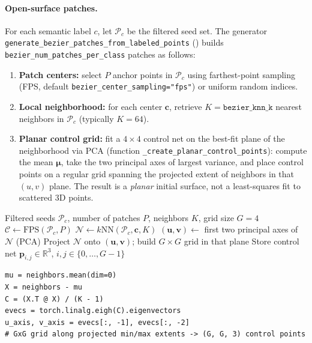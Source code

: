 \paragraph{Open-surface patches.}
For each semantic label $c$, let $\mathcal{P}_c$ be the filtered seed set. The generator \texttt{generate\_bezier\_patches\_from\_labeled\_points} () builds \texttt{bezier\_num\_patches\_per\_class} patches as follows:
\begin{enumerate}
    \item \textbf{Patch centers:} select $P$ anchor points in $\mathcal{P}_c$ using farthest-point sampling (FPS, default \texttt{bezier\_center\_sampling="fps"}) or uniform random indices.
    \item \textbf{Local neighborhood:} for each center $\mathbf{c}$, retrieve $K=\texttt{bezier\_knn\_k}$ nearest neighbors in $\mathcal{P}_c$ (typically $K=64$).
    \item \textbf{Planar control grid:} fit a $4\times 4$ control net on the best-fit plane of the neighborhood via PCA (function \texttt{\_create\_planar\_control\_points}): compute the mean $\boldsymbol{\mu}$, take the two principal axes of largest variance, and place control points on a regular grid spanning the projected extent of neighbors in that $(u,v)$ plane. The result is a \emph{planar} initial surface, not a least-squares fit to scattered 3D points.
\end{enumerate}

\begin{algorithm}[htbp]
\caption{Open-mode B\'ezier control-point initialization (per class, per patch)}
\label{alg:bezier_cp_open}
\begin{algorithmic}[1]
\Require Filtered seeds $\mathcal{P}_c$, number of patches $P$, neighbors $K$, grid size $G{=}4$
\State $\mathcal{C} \gets \mathrm{FPS}(\mathcal{P}_c, P)$ 
    \State $\mathcal{N} \gets k\mathrm{NN}(\mathcal{P}_c, \mathbf{c}, K)$
    \State $(\mathbf{u},\mathbf{v}) \gets$ first two principal axes of $\mathcal{N}$ (PCA)
    \State Project $\mathcal{N}$ onto $(\mathbf{u},\mathbf{v})$; build $G\times G$ grid in that plane
    \State Store control net $\mathbf{p}_{i,j}\in\mathbb{R}^3$, $i,j\in\{0,\ldots,G{-}1\}$
\EndFor
\end{algorithmic}
\end{algorithm}

\begin{lstlisting}[caption={Planar control grid from a $k$-NN neighborhood (\filepath{bezier\_surface.py}).},label={lst:planar_cp}]
mu = neighbors.mean(dim=0)
X = neighbors - mu
C = (X.T @ X) / (K - 1)
evecs = torch.linalg.eigh(C).eigenvectors
u_axis, v_axis = evecs[:, -1], evecs[:, -2]
# GxG grid along projected min/max extents -> (G, G, 3) control points
\end{lstlisting}

